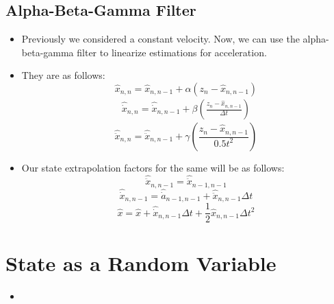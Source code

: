 \documentclass[a4paper, 11pt]{article}
\begin{document}
		\subsection{Alpha-Beta-Gamma Filter}
		\begin{itemize}
			\item Previously we considered a constant velocity. Now, we can use the alpha-beta-gamma filter to linearize estimations for acceleration.
			\item They are as follows:
			\begin{equation}
				\hat{x}_{n,n} = \hat{x}_{n,n-1} + \alpha (z_n-\hat{x}_{n,n-1})
			\end{equation}
			\begin{equation}
				\begin{split}
					\hat{\dot{x}}_{n,n} = \hat{\dot{x}}_{n,n-1} + \beta\left(\frac{z_n - \hat{x}_{n,n-1}}{\Delta t}\right)
				\end{split}
			\end{equation}
			\begin{equation}
				\hat{\ddot{x}}_{n,n} = \hat{\ddot{x}}_{n, n-1} + \gamma \left(\frac{z_n - \hat{x}_{n,n-1}}{0.5 t^2}\right)
			\end{equation}
			\item Our state extrapolation factors for the same will be as follows:
			\begin{equation}
				\hat{\ddot{x}}_{n,n-1} = \hat{\ddot{x}}_{n-1,n-1}
			\end{equation}
			\begin{equation}
				\hat{\dot{x}}_{n, n-1} = \hat{\dot{a}}_{n-1, n-1} + \hat{\ddot{x}}_{n, n-1}\Delta t
			\end{equation}
			\begin{equation}
				\hat{x} = \hat{x} + \hat{\dot{x}}_{n, n-1}\Delta t + \frac{1}{2}\hat{x}_{n,n-1} \Delta t^2 
			\end{equation}
		\end{itemize}
	
	\section{State as a Random Variable}
	\begin{itemize}
		\item 
	\end{itemize}
\end{document}
